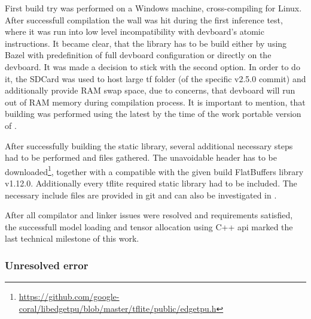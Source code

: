 {First build try was performed on a Windows machine, cross-compiling for  Linux. After successfull compilation the wall was hit during the first inference test,
where it was run into low level incompatibility with \gls{devboard}'s atomic instructions. It became clear, that the library has to be build either by using Bazel with predefinition
of full \gls{devboard} configuration or directly on the \gls{devboard}. It was made a decision to stick with the second option. In order to do it, the SDCard was used to host large
\gls{tf} folder (of the specific v2.5.0 commit) and additionally provide RAM swap space, due to concerns,
that \gls{devboard} will run out of RAM memory during compilation process. It is important to mention,
that building was performed using the latest by the time of the work portable version of . 

After successfully building the static  library, several additional necessary steps had to be performed and files gathered.
The unavoidable  header has to be downloaded\footnote{\url{https://github.com/google-coral/libedgetpu/blob/master/tflite/public/edgetpu.h}},
together with a compatible with the given build FlatBuffers library v1.12.0. Additionally every \gls{tflite} required static library had to be included.
The necessary include files are provided in git and can also be investigated in .

After all compilator and linker issues were resolved and requirements satisfied, the successfull model loading and tensor allocation using C++ \gls{api}
marked the last technical milestone of this work.

\subsubsection*{Unresolved error}

}
